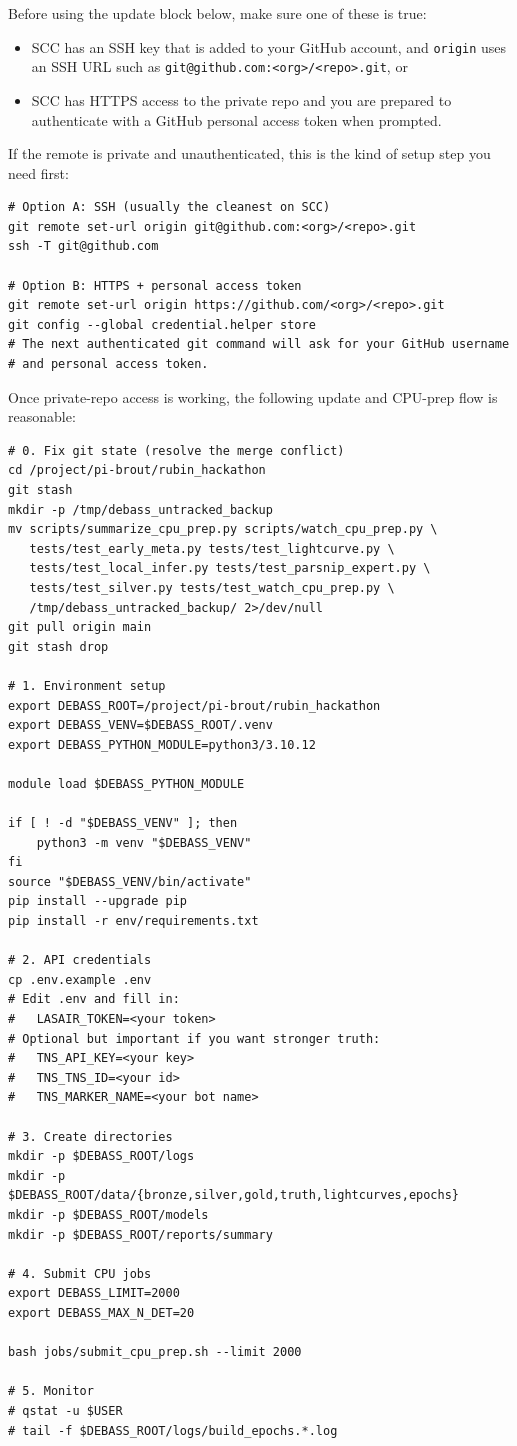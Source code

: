 \documentclass[11pt]{article}
\newcommand{\code}[1]{\texttt{#1}}
\begin{document}
Before using the update block below, make sure one of these is true:

\begin{itemize}
\item SCC has an SSH key that is added to your GitHub account, and \code{origin} uses an SSH URL such as \code{git@github.com:<org>/<repo>.git}, or
\item SCC has HTTPS access to the private repo and you are prepared to authenticate with a GitHub personal access token when prompted.
\end{itemize}

If the remote is private and unauthenticated, this is the kind of setup step you need first:

\begin{verbatim}
# Option A: SSH (usually the cleanest on SCC)
git remote set-url origin git@github.com:<org>/<repo>.git
ssh -T git@github.com

# Option B: HTTPS + personal access token
git remote set-url origin https://github.com/<org>/<repo>.git
git config --global credential.helper store
# The next authenticated git command will ask for your GitHub username
# and personal access token.
\end{verbatim}

Once private-repo access is working, the following update and CPU-prep flow is reasonable:

\begin{verbatim}
# 0. Fix git state (resolve the merge conflict)
cd /project/pi-brout/rubin_hackathon
git stash
mkdir -p /tmp/debass_untracked_backup
mv scripts/summarize_cpu_prep.py scripts/watch_cpu_prep.py \
   tests/test_early_meta.py tests/test_lightcurve.py \
   tests/test_local_infer.py tests/test_parsnip_expert.py \
   tests/test_silver.py tests/test_watch_cpu_prep.py \
   /tmp/debass_untracked_backup/ 2>/dev/null
git pull origin main
git stash drop

# 1. Environment setup
export DEBASS_ROOT=/project/pi-brout/rubin_hackathon
export DEBASS_VENV=$DEBASS_ROOT/.venv
export DEBASS_PYTHON_MODULE=python3/3.10.12

module load $DEBASS_PYTHON_MODULE

if [ ! -d "$DEBASS_VENV" ]; then
    python3 -m venv "$DEBASS_VENV"
fi
source "$DEBASS_VENV/bin/activate"
pip install --upgrade pip
pip install -r env/requirements.txt

# 2. API credentials
cp .env.example .env
# Edit .env and fill in:
#   LASAIR_TOKEN=<your token>
# Optional but important if you want stronger truth:
#   TNS_API_KEY=<your key>
#   TNS_TNS_ID=<your id>
#   TNS_MARKER_NAME=<your bot name>

# 3. Create directories
mkdir -p $DEBASS_ROOT/logs
mkdir -p $DEBASS_ROOT/data/{bronze,silver,gold,truth,lightcurves,epochs}
mkdir -p $DEBASS_ROOT/models
mkdir -p $DEBASS_ROOT/reports/summary

# 4. Submit CPU jobs
export DEBASS_LIMIT=2000
export DEBASS_MAX_N_DET=20

bash jobs/submit_cpu_prep.sh --limit 2000

# 5. Monitor
# qstat -u $USER
# tail -f $DEBASS_ROOT/logs/build_epochs.*.log
\end{verbatim}
\end{document}
